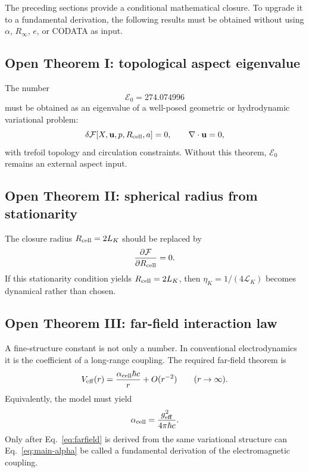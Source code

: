 \documentclass[11pt]{article}
\newcommand{\LK}{\mathcal L_K}
\newcommand{\Ezero}{\mathcal E_0}
\newcommand{\alphacell}{\alpha_{\rm cell}}
\begin{document}
\label{sec:fundamental}

The preceding sections provide a conditional mathematical closure.  To upgrade it to a
fundamental derivation, the following results must be obtained without using \(\alpha\),
\(R_\infty\), \(e\), or CODATA as input.

\subsection{Open Theorem I: topological aspect eigenvalue}

The number
\begin{equation}
  \Ezero=274.074996
\end{equation}
must be obtained as an eigenvalue of a well-posed geometric or hydrodynamic variational
problem:
\begin{equation}
  \delta \mathcal F[X,\mathbf u,p,R_{\rm cell},a]=0,
  \qquad
  \nabla\cdot\mathbf u=0,
\end{equation}
with trefoil topology and circulation constraints.  Without this theorem, \(\Ezero\) remains
an external aspect input.

\subsection{Open Theorem II: spherical radius from stationarity}

The closure radius \(R_{\rm cell}=2L_K\) should be replaced by
\begin{equation}
  \frac{\partial \mathcal F}{\partial R_{\rm cell}}=0.
\end{equation}
If this stationarity condition yields \(R_{\rm cell}=2L_K\), then
\(\eta_K=1/(4\LK)\) becomes dynamical rather than chosen.

\subsection{Open Theorem III: far-field interaction law}

A fine-structure constant is not only a number.  In conventional electrodynamics it is the
coefficient of a long-range coupling.  The required far-field theorem is
\begin{equation}
  V_{\rm eff}(r)
  =
  \frac{\alphacell\hbar c}{r}
  +
  O(r^{-2})
  \qquad (r\to\infty).
  \label{eq:farfield}
\end{equation}
Equivalently, the model must yield
\begin{equation}
  \alphacell
  =
  \frac{g_{\rm eff}^2}{4\pi\hbar c}.
\end{equation}
Only after Eq.~\eqref{eq:farfield} is derived from the same variational structure can
Eq.~\eqref{eq:main-alpha} be called a fundamental derivation of the electromagnetic coupling.
\end{document}
